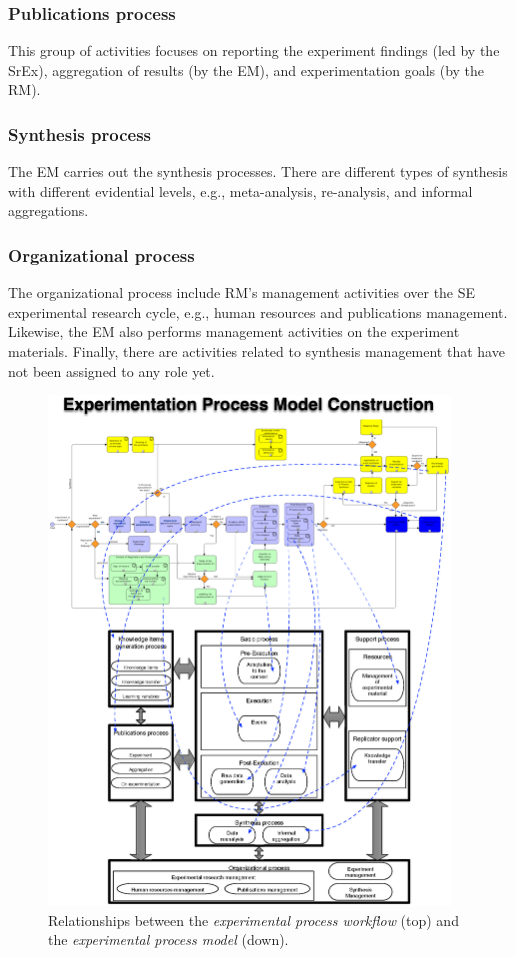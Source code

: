 \subsubsection{Publications process}
This group of activities focuses on reporting the experiment findings (led by the SrEx), aggregation of results (by the EM), and experimentation goals (by the RM).

\subsubsection{Synthesis process}
The EM carries out the synthesis processes. There are different types of synthesis with different evidential levels, e.g., meta-analysis, re-analysis, and informal aggregations.

\subsubsection{Organizational process}
The organizational process include RM's management activities over the SE experimental research cycle, e.g., human resources and publications management. Likewise, the EM also performs management activities on the experiment materials. Finally, there are activities related to synthesis management that have not been assigned to any role yet.

\begin{figure}[htbp]
\begin{center}
\includegraphics[trim=0 0 0 48,clip,width=0.95\textwidth]{images/Experimentation-Process-Model-Construction}
\caption{Relationships between the \textit{experimental process workflow} (top) and the \textit{experimental process model} (down).}
\label{fig-EPM-construction}
\end{center}
\end{figure}

